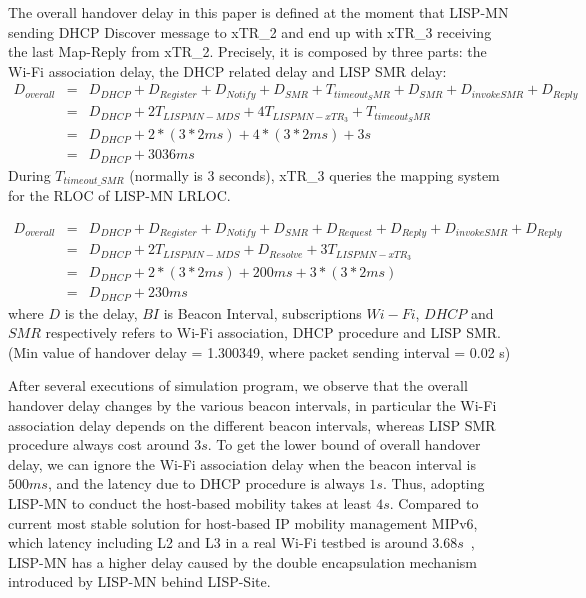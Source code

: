 The overall handover delay in this paper is defined at the moment that LISP-MN sending DHCP Discover message to xTR\_2 and end up with xTR\_3 receiving the last Map-Reply from xTR\_2. Precisely, it is composed by three parts: the Wi-Fi association delay, the DHCP related delay and LISP SMR delay:
\begin{eqnarray}
D_{overall} &=& D_{DHCP} + D_{Register} + D_{Notify} + D_{SMR} + T_{timeout_SMR} + D_{SMR} + D_{invokeSMR} + D_{Reply} \nonumber \\
&=& D_{DHCP} + 2T_{LISPMN-MDS} + 4T_{LISPMN-xTR_3} + T_{timeout_SMR}\nonumber \\
&=& D_{DHCP} + 2* (3*2ms) + 4*(3*2ms) + 3s\nonumber \\
&=& D_{DHCP} + 3036 ms
\end{eqnarray}
During $T_{timeout\_SMR}$ (normally is 3 seconds), xTR\_3 queries the mapping system for the RLOC of LISP-MN LRLOC.


\begin{eqnarray}
	D_{overall} &=& D_{DHCP} + D_{Register} + D_{Notify} + D_{SMR} + D_{Request} + D_{Reply} + D_{invokeSMR} + D_{Reply} \nonumber \\
	&=& D_{DHCP} + 2T_{LISPMN-MDS} + D_{Resolve} + 3T_{LISPMN-xTR_3} \nonumber \\
	&=& D_{DHCP} + 2* (3*2ms) + 200ms + 3*(3*2ms) \nonumber \\
	&=& D_{DHCP} + 230 ms
\end{eqnarray}
where $D$ is the delay, $BI$ is Beacon Interval, subscriptions $Wi-Fi$, $DHCP$ and $SMR$ respectively refers to Wi-Fi association, DHCP procedure and LISP SMR. (Min value of handover delay = 1.300349, where packet sending interval = 0.02 s) 

After several executions of simulation program, we observe that the overall handover delay changes by the various beacon intervals, in particular the Wi-Fi association delay depends on the different beacon intervals, whereas LISP SMR procedure always cost around $3s$. To get the lower bound of overall handover delay, we can ignore the Wi-Fi association delay when the beacon interval is $500ms$, and the latency due to DHCP procedure is always $1s$. Thus, adopting LISP-MN to conduct the host-based mobility takes at least $4s$. Compared to current most stable solution for host-based IP mobility management MIPv6, which latency including L2 and L3 in a real Wi-Fi testbed is around $3.68s$~\cite{vassiliou2010analysis}, LISP-MN has a higher delay caused by the double encapsulation mechanism introduced by LISP-MN behind LISP-Site. 

